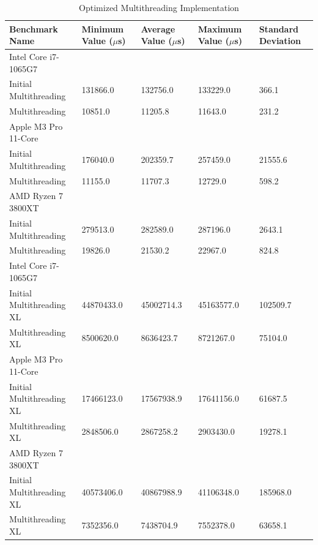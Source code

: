\documentclass[modern,longauthor]{aastex7}
\begin{document}
\begin{table}[htb!]
\centering
\caption{Optimized Multithreading Implementation\label{tab:multithreading}}
\begin{tabular}{p{5cm} p{2cm} p{2cm} p{2cm} p{2cm}}
\hline
Benchmark Name & Minimum Value ($\mu$s) & Average Value ($\mu$s) & Maximum Value ($\mu$s) & Standard Deviation \\
\hline
Intel Core i7-1065G7 \\
\hspace{0.5cm}Initial Multithreading & 131866.0 & 132756.0 & 133229.0 & 366.1 \\
\hspace{0.5cm}Multithreading & 10851.0 & 11205.8 & 11643.0 & 231.2 \\
Apple M3 Pro 11-Core \\
\hspace{0.5cm}Initial Multithreading & 176040.0 & 202359.7 & 257459.0 & 21555.6 \\
\hspace{0.5cm}Multithreading & 11155.0 & 11707.3 & 12729.0 & 598.2 \\
AMD Ryzen 7 3800XT \\
\hspace{0.5cm}Initial Multithreading & 279513.0 & 282589.0 & 287196.0 & 2643.1 \\
\hspace{0.5cm}Multithreading & 19826.0 & 21530.2 & 22967.0 & 824.8 \\
\hline
Intel Core i7-1065G7 \\
\hspace{0.5cm}Initial Multithreading XL & 44870433.0 & 45002714.3 & 45163577.0 & 102509.7 \\
\hspace{0.5cm}Multithreading XL & 8500620.0 & 8636423.7 & 8721267.0 & 75104.0 \\
Apple M3 Pro 11-Core \\
\hspace{0.5cm}Initial Multithreading XL & 17466123.0 & 17567938.9 & 17641156.0 & 61687.5 \\
\hspace{0.5cm}Multithreading XL & 2848506.0 & 2867258.2 & 2903430.0 & 19278.1 \\
AMD Ryzen 7 3800XT \\
\hspace{0.5cm}Initial Multithreading XL & 40573406.0 & 40867988.9 & 41106348.0 & 185968.0 \\
\hspace{0.5cm}Multithreading XL & 7352356.0 & 7438704.9 & 7552378.0 & 63658.1 \\
\hline
\end{tabular}
\end{table}
\FloatBarrier
\end{document}
